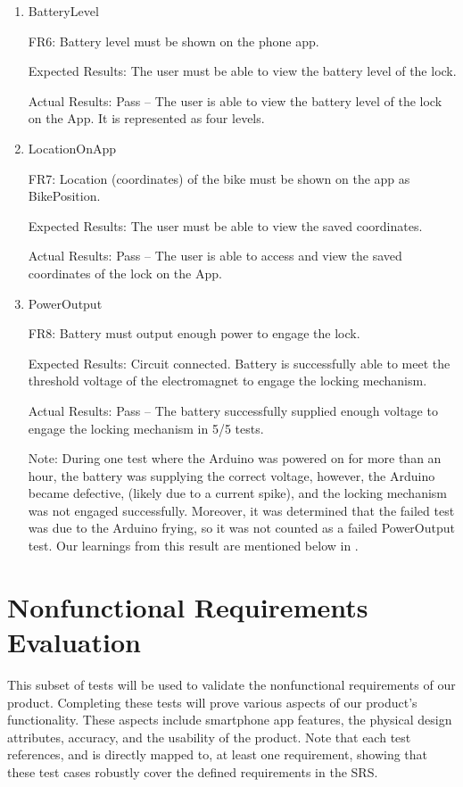 \documentclass[12pt, titlepage]{article}
\begin{document}
\begin{enumerate}

\item{BatteryLevel

FR6: Battery level must be shown on the phone app. }

Expected Results: The user must be able to view the battery level of the lock.

Actual Results: Pass -- The user is able to view the battery level of the lock on the App. It is represented as four levels. 

\item{LocationOnApp

FR7: Location (coordinates) of the bike must be shown on the app as BikePosition.}

Expected Results: The user must be able to view the saved coordinates.

Actual Results: Pass -- The user is able to access and view the saved coordinates of the lock on the App.

\item{PowerOutput

FR8: Battery must output enough power to engage the lock. }

Expected Results: Circuit connected. Battery is successfully able to meet the threshold voltage of the electromagnet to engage the locking mechanism.  

Actual Results: Pass -- The battery successfully supplied enough voltage to engage the locking mechanism in 5/5 tests. 

Note: During one test where the Arduino was powered on for more than an hour, the battery was supplying the correct voltage, however, the Arduino became defective, (likely due to a current spike), and the locking mechanism was not engaged successfully. Moreover, it was determined that the failed test was due to the Arduino frying, so it was not counted as a failed PowerOutput test. Our learnings from this result are mentioned below in . 

\end{enumerate}

\section{Nonfunctional Requirements Evaluation}

This subset of tests will be used to validate the nonfunctional requirements of our product. Completing these tests will prove various aspects of our product's functionality. These aspects include smartphone app features, the physical design attributes, accuracy, and the usability of the product. Note that each test references, and is directly mapped to, at least one requirement, showing that these test cases robustly cover the defined requirements in the SRS.
\end{document}
